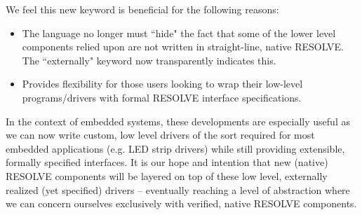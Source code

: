 


We feel this new keyword is beneficial for the following reasons:
\begin{itemize}
\item The language no longer must ``hide" the fact that some of the lower level components relied upon are not written in straight-line, native RESOLVE. The ``externally" keyword now transparently indicates this.
\item Provides flexibility for those users looking to wrap their low-level programs/drivers with formal RESOLVE interface specifications.
\end{itemize}

In the context of embedded systems, these developments are especially useful as we can now write custom, low level  drivers of the sort required for most embedded applications (e.g. LED strip drivers) while still providing extensible, formally specified interfaces. It is our hope and intention that new (native) RESOLVE components will be layered on top of these low level, externally realized (yet specified) drivers -- eventually reaching a level of abstraction where we can concern ourselves exclusively with verified, native RESOLVE components.



